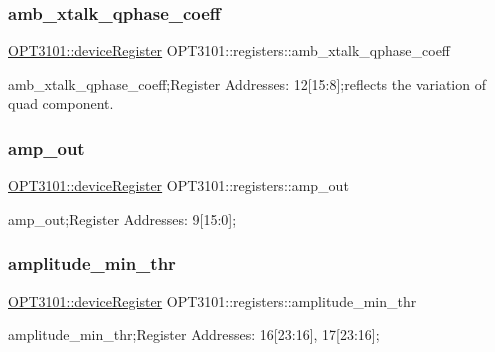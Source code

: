 \subsubsection{\texorpdfstring{amb\+\_\+xtalk\+\_\+qphase\+\_\+coeff}{amb\_xtalk\_qphase\_coeff}}
{\footnotesize\ttfamily \mbox{\hyperlink{class_o_p_t3101_1_1device_register}{O\+P\+T3101\+::device\+Register}} O\+P\+T3101\+::registers\+::amb\+\_\+xtalk\+\_\+qphase\+\_\+coeff}



amb\+\_\+xtalk\+\_\+qphase\+\_\+coeff;Register Addresses\+: 12\mbox{[}15\+:8\mbox{]};reflects the variation of quad component. 

\mbox{\label{class_o_p_t3101_1_1registers_a09663efd977de72bdf7820e0a8f92390}} 
\subsubsection{\texorpdfstring{amp\+\_\+out}{amp\_out}}
{\footnotesize\ttfamily \mbox{\hyperlink{class_o_p_t3101_1_1device_register}{O\+P\+T3101\+::device\+Register}} O\+P\+T3101\+::registers\+::amp\+\_\+out}



amp\+\_\+out;Register Addresses\+: 9\mbox{[}15\+:0\mbox{]}; 

\mbox{\label{class_o_p_t3101_1_1registers_abdb9db1e1ff8bda71eccaea718b116d0}} 
\subsubsection{\texorpdfstring{amplitude\+\_\+min\+\_\+thr}{amplitude\_min\_thr}}
{\footnotesize\ttfamily \mbox{\hyperlink{class_o_p_t3101_1_1device_register}{O\+P\+T3101\+::device\+Register}} O\+P\+T3101\+::registers\+::amplitude\+\_\+min\+\_\+thr}



amplitude\+\_\+min\+\_\+thr;Register Addresses\+: 16\mbox{[}23\+:16\mbox{]}, 17\mbox{[}23\+:16\mbox{]}; 

